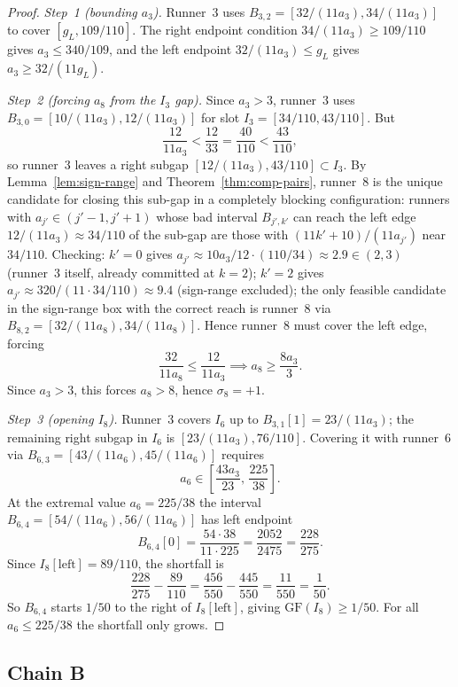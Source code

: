 \documentclass[12pt,a4paper]{amsart}
\theoremstyle{definition}
\theoremstyle{remark}
\newcommand{\GF}{\mathrm{GF}}
\begin{document}
\begin{proof}
\textit{Step~1 (bounding $a_3$).} Runner~3 uses $B_{3,2}=[32/(11a_3),34/(11a_3)]$
to cover $[g_L,109/110]$. The right endpoint condition $34/(11a_3)\ge 109/110$
gives $a_3\le 340/109$, and the left endpoint $32/(11a_3)\le g_L$
gives $a_3\ge 32/(11g_L)$.

\textit{Step~2 (forcing $a_8$ from the $I_3$ gap).} Since $a_3>3$, runner~3 uses
$B_{3,0}=[10/(11a_3),12/(11a_3)]$ for slot $I_3=[34/110,43/110]$. But
\[
  \frac{12}{11a_3} < \frac{12}{33} = \frac{40}{110} < \frac{43}{110},
\]
so runner~3 leaves a right subgap $[12/(11a_3),43/110]\subset I_3$. By
Lemma~\ref{lem:sign-range} and Theorem~\ref{thm:comp-pairs}, runner~8 is the unique
candidate for closing this sub-gap in a completely blocking configuration: runners with
$a_{j'}\in(j'-1,j'+1)$ whose bad interval $B_{j',k'}$ can reach the left edge
$12/(11a_3)\approx 34/110$ of the sub-gap are those with $(11k'+10)/(11a_{j'})$ near
$34/110$. Checking: $k'=0$ gives $a_{j'}\approx 10a_3/12\cdot (110/34)\approx 2.9\in(2,3)$
(runner~3 itself, already committed at $k=2$); $k'=2$ gives $a_{j'}\approx 320/(11\cdot
34/110)\approx 9.4$ (sign-range excluded); the only feasible candidate in the sign-range
box with the correct reach is runner~8 via $B_{8,2}=[32/(11a_8),34/(11a_8)]$.
Hence runner~8 must cover the left edge, forcing
\[
  \frac{32}{11a_8} \le \frac{12}{11a_3} \implies a_8 \ge \frac{8a_3}{3}.
\]
Since $a_3>3$, this forces $a_8>8$, hence $\sigma_8=+1$.

\textit{Step~3 (opening $I_8$).} Runner~3 covers $I_6$ up to $B_{3,1}[1]=23/(11a_3)$;
the remaining right subgap in $I_6$ is $[23/(11a_3),76/110]$. Covering it with runner~6
via $B_{6,3}=[43/(11a_6),45/(11a_6)]$ requires
\[
  a_6 \in \left[\frac{43a_3}{23},\,\frac{225}{38}\right].
\]
At the extremal value $a_6=225/38$ the interval $B_{6,4}=[54/(11a_6),56/(11a_6)]$ has left
endpoint
\[
  B_{6,4}[0] = \frac{54\cdot 38}{11\cdot 225} = \frac{2052}{2475} = \frac{228}{275}.
\]
Since $I_8[\mathrm{left}]=89/110$, the shortfall is
\[
  \frac{228}{275} - \frac{89}{110}
  = \frac{456}{550} - \frac{445}{550}
  = \frac{11}{550} = \frac{1}{50}.
\]
So $B_{6,4}$ starts $1/50$ to the right of $I_8[\mathrm{left}]$, giving $\GF(I_8)\ge 1/50$.
For all $a_6\le 225/38$ the shortfall only grows.
\end{proof}

\subsection{Chain B}
\end{document}
